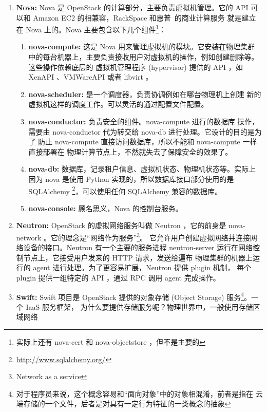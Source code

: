 \begin{enumerate}
    \item \textbf{Nova:} Nova 是 OpenStack 的计算部分，主要负责虚拟机管理。它的 API
    可以和 Amazon EC2 的相兼容，RackSpace 和惠普~\cite{hpe-openstack}的商业计算服务
    就是建立在 Nova 上的。Nova 主要包含以下几个组件\footnote{实际上还有 nova-cert
     和 nova-objectstore ，但不是主要的}：
    \begin{enumerate}
        \item \textbf{nova-compute:} 这是 Nova 用来管理虚拟机的模块。它安装在物理集群
        中的每台机器上，主要负责接收用户对虚拟机的操作，例如创建删除等。这些操作依赖底层的
        虚拟机管理程序 (hypervisor) 提供的 API ，如 XenAPI 、VMWareAPI
         或者 libvirt 。
        \item \textbf{nova-scheduler:} 是一个调度器，负责协调例如在哪台物理机上创建
        新的虚拟机这样的调度工作。可以灵活的通过配置文件配置。
        \item \textbf{nova-conductor:} 负责安全的组件。nova-compute 进行的数据库
        操作，需要由 nova-conductor 代为转交给 nova-db 进行处理。它设计的目的是为了
        防止 nova-compute 直接访问数据库，所以不能和 nova-compute 一样直接部署在
        物理计算节点上，不然就失去了保障安全的效果了。~\cite{conductor}
        \item \textbf{nova-db:} 数据库，记录租户信息、虚拟机状态、物理机状态等。实际上
        因为 nova 是使用 Python 实现的，所以数据库接口部分使用的是 SQLAlchemy
         \footnote{\url{http://www.sqlalchemy.org/}}，可以使用任何 SQLAlchemy
         兼容的数据库。
        \item \textbf{nova-console:} 顾名思义，Nova 的控制台服务。
    \end{enumerate}
    \item \textbf{Neutron:} OpenStack 的虚拟网络服务叫做 Neutron ，它的前身是
     nova-network 。它的理念是“网络作为服务”\footnote{Network as a service}。
    它允许用户创建虚拟网络并连接网络设备的接口。Neutron 有一个主要的服务进程
     neutron-server 运行在网络控制节点上，它接受用户发来的 HTTP 请求，发送给遍布
    物理集群的机器上运行的 agent 进行处理。为了更容易扩展，Neutron 提供 plugin 机制，
    每个 plugin 提供一组特定的 API ，通过 RPC 调用 agent 完成操作。
    \item \textbf{Swift:} Swift 项目是 OpenStack 提供的对象存储 (Object Storage)
     服务\footnote{对于程序员来说，这个概念容易和“面向对象”中的对象相混淆，前者是指在
    云端存储的一个文件，后者是对具有一定行为特征的一类概念的抽象}。一个 IaaS 服务框架，
    为什么要提供存储服务呢？物理世界中，一般使用存储区域网络

\end{enumerate}

